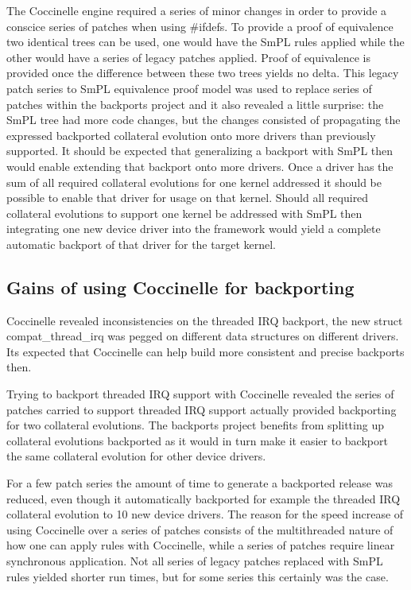 \documentclass[a4paper,10pt]{article}
\begin{document}
The Coccinelle engine required a series of minor changes in order to provide a
conscice series of patches when using \#ifdefs. To provide a proof of equivalence
two identical trees can be used, one would have the SmPL rules applied while
the other would have a series of legacy patches applied. Proof of equivalence
is provided once the difference between these two trees yields no delta. This
legacy patch series to SmPL equivalence proof model was used to replace series
of patches within the backports project and it also revealed a little surprise:
the SmPL tree had more code changes, but the changes consisted of propagating the
expressed backported collateral evolution onto more drivers than previously
supported. It should be expected that generalizing a backport with SmPL
then would enable extending that backport onto more drivers. Once a driver
has the sum of all required collateral evolutions for one kernel addressed
it should be possible to enable that driver for usage on that kernel.
Should all required collateral evolutions to support one kernel be addressed
with SmPL then integrating one new device driver into the framework would
yield a complete automatic backport of that driver for the target kernel.

\subsection{Gains of using Coccinelle for backporting}

Coccinelle revealed inconsistencies on the threaded IRQ backport,
the new struct compat\_thread\_irq was pegged on different data
structures on different drivers. Its expected that Coccinelle
can help build more consistent and precise backports then.

Trying to backport threaded IRQ support with Coccinelle revealed
the series of patches carried to support threaded IRQ support
actually provided backporting for two collateral evolutions. The
backports project benefits from splitting up collateral evolutions
backported as it would in turn make it easier to backport the same
collateral evolution for other device drivers.

For a few patch series the amount of time to generate a backported release was
reduced, even though it automatically backported for example the threaded IRQ
collateral evolution to 10 new device drivers. The reason for the speed
increase of using Coccinelle over a series of patches consists of the
multithreaded nature of how one can apply rules with Coccinelle, while a series
of patches require linear synchronous application. Not all series of legacy
patches replaced with SmPL rules yielded shorter run times, but for some
series this certainly was the case.
\end{document}

